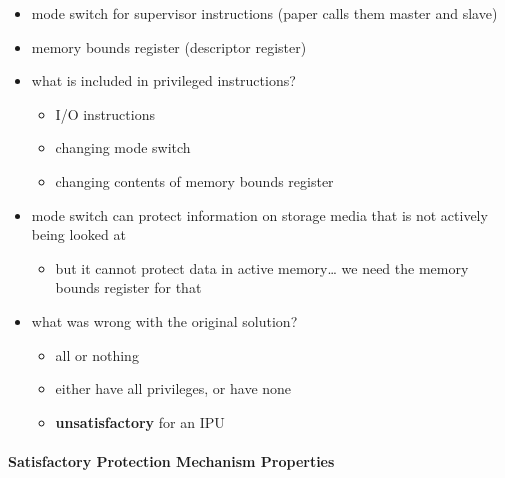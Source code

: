 \documentclass[
  12pt]{findlay}
\providecommand{\tightlist}{%
  \setlength{\itemsep}{0pt}\setlength{\parskip}{0pt}}
\begin{document}
\begin{itemize}
\tightlist
\item
  mode switch for supervisor instructions (paper calls them master and
  slave)
\item
  memory bounds register (descriptor register)
\item
  what is included in privileged instructions?

  \begin{itemize}
  \tightlist
  \item
    I/O instructions
  \item
    changing mode switch
  \item
    changing contents of memory bounds register
  \end{itemize}
\item
  mode switch can protect information on storage media that is not
  actively being looked at

  \begin{itemize}
  \tightlist
  \item
    but it cannot protect data in active memory\ldots{} we need the
    memory bounds register for that
  \end{itemize}
\item
  what was wrong with the original solution?

  \begin{itemize}
  \tightlist
  \item
    all or nothing
  \item
    either have all privileges, or have none
  \item
    \textbf{unsatisfactory} for an IPU
  \end{itemize}
\end{itemize}

\hypertarget{satisfactory-protection-mechanism-properties}{%
\paragraph{Satisfactory Protection Mechanism
Properties}\label{satisfactory-protection-mechanism-properties}}
\end{document}
